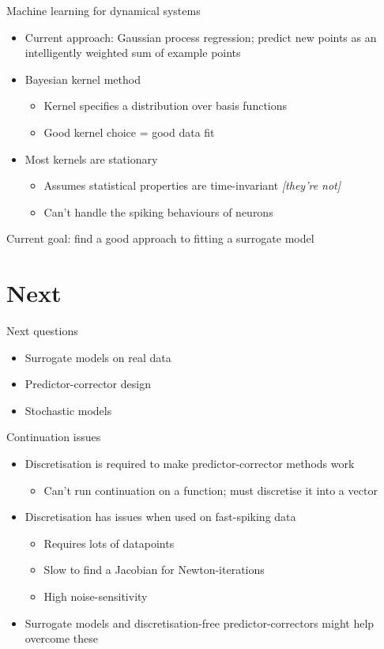 \documentclass[presentation]{beamer}
\begin{document}
\begin{frame}[label={sec:org35be246}]{Machine learning for dynamical systems}
\begin{itemize}[<+->]
\item Current approach: Gaussian process regression; predict new points as an intelligently weighted sum of example points
\item Bayesian kernel method
\begin{itemize}
\item Kernel specifies a distribution over basis functions
\item Good kernel choice = good data fit
\end{itemize}
\item Most kernels are stationary
\begin{itemize}
\item Assumes statistical properties are time-invariant \emph{[they're not]}
\item Can't handle the spiking behaviours of neurons
\end{itemize}
\end{itemize}

\vfill

Current goal: find a good approach to fitting a surrogate model
\end{frame}


\section{Next}
\label{sec:orgf548bb9}

\begin{frame}[label={sec:org2157b55}]{Next questions}
\begin{itemize}
\item Surrogate models on real data
\item Predictor-corrector design
\item Stochastic models
\end{itemize}
\end{frame}

\begin{frame}[label={sec:org621bd50}]{Continuation issues}
\begin{itemize}
\item Discretisation is required to make predictor-corrector methods work
\begin{itemize}
\item Can't run continuation on a function; must discretise it into a vector
\end{itemize}
\item Discretisation has issues when used on fast-spiking data
\begin{itemize}
\item Requires lots of datapoints
\item Slow to find a Jacobian for Newton-iterations
\item High noise-sensitivity
\end{itemize}
\item Surrogate models and discretisation-free predictor-correctors might help overcome these
\end{itemize}
\end{frame}
\end{document}
